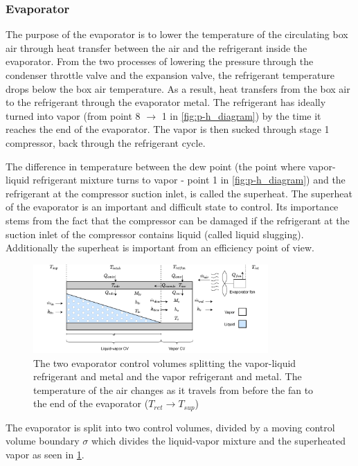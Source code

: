 \newpage
\subsubsection{Evaporator}\label{sec:evaporator}
The purpose of the evaporator is to lower the temperature of the circulating box air through heat transfer between the air and the refrigerant inside the evaporator. From the two processes of lowering the pressure through the condenser throttle valve and the expansion valve, the refrigerant temperature drops below the box air temperature. As a result, heat transfers from the box air to the refrigerant through the evaporator metal. The refrigerant has ideally turned into vapor (from point 8 $\rightarrow$ 1 in \cref{fig:p-h_diagram}) by the time it reaches the end of the evaporator. The vapor is then sucked through stage 1 compressor, back through the refrigerant cycle.

The difference in temperature between the dew point (the point where vapor-liquid refrigerant mixture turns to vapor - point 1 in \cref{fig:p-h_diagram}) and the refrigerant at the compressor suction inlet, is called the superheat. The superheat of the evaporator is an important and difficult state to control. Its importance stems from the fact that the compressor can be damaged if the refrigerant at the suction inlet of the compressor contains liquid (called liquid slugging). Additionally the superheat is important from an efficiency point of view. 

\begin{figure}[h!]
	\centering
	\includegraphics[width=0.8\textwidth]{Graphics/Evaporator_CV_diagram.pdf}
	\caption{The two evaporator control volumes splitting the vapor-liquid refrigerant and metal and the vapor refrigerant and metal. The temperature of the air changes as it travels from before the fan to the end of the evaporator ($T_{ret} \rightarrow T_{sup}$)}
	\label{fig:evap_CV}
\end{figure}

The evaporator is split into two control volumes, divided by a moving control volume boundary $\sigma$ which divides the liquid-vapor mixture and the superheated vapor as seen in \cref{fig:evap_CV}.

